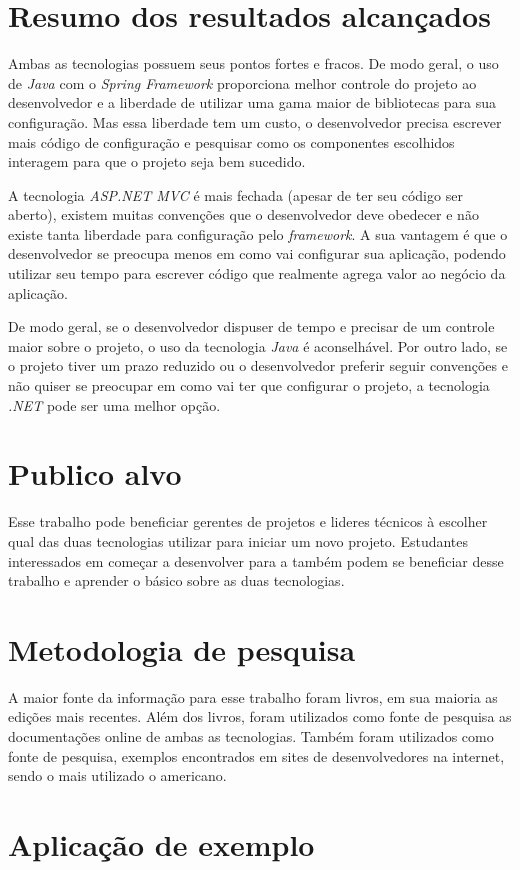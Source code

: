 \section{Resumo dos resultados alcançados}
\label{sec:resumoresultados}

Ambas as tecnologias possuem seus pontos fortes e fracos. De modo geral, o uso de \textit{Java} com o \textit{Spring Framework} proporciona melhor controle do projeto ao desenvolvedor e a liberdade de utilizar uma gama maior de bibliotecas para sua configuração. 
Mas essa liberdade tem um custo, o desenvolvedor precisa escrever mais código de configuração e pesquisar como os componentes escolhidos interagem para que o projeto seja bem sucedido.

A tecnologia \textit{ASP.NET MVC} é mais fechada (apesar de ter seu código ser aberto), existem muitas convenções que o desenvolvedor deve obedecer e não existe tanta liberdade para configuração pelo \textit{framework}. 
A sua vantagem é que o desenvolvedor se preocupa menos em como vai configurar sua aplicação, podendo utilizar seu tempo para escrever código que realmente agrega valor ao negócio da aplicação.

De modo geral, se o desenvolvedor dispuser de tempo e precisar de um controle maior sobre o projeto, o uso da tecnologia \textit{Java} é aconselhável. Por outro lado, se o projeto tiver um prazo reduzido ou o desenvolvedor preferir seguir convenções e não quiser se preocupar em como vai ter que configurar o projeto, a tecnologia \textit{.NET} pode ser uma melhor opção.
 
\section{Publico alvo}
\label{sec:publicalvo}

Esse trabalho pode beneficiar gerentes de projetos e lideres técnicos à escolher qual das duas tecnologias utilizar para iniciar um novo projeto. Estudantes interessados em começar a desenvolver para a  também podem se beneficiar desse trabalho e aprender o básico sobre as duas tecnologias.

\section{Metodologia de pesquisa}
\label{sec:metodologiapesquisa}

A maior fonte da informação para esse trabalho foram livros, em sua maioria as edições mais recentes. Além dos livros, foram utilizados como fonte de pesquisa as documentações online de ambas as tecnologias. Também foram utilizados como fonte de pesquisa, exemplos encontrados em sites de desenvolvedores na internet, sendo o mais utilizado o  americano.

\section{Aplicação de exemplo}